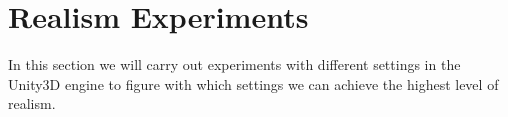 \section{Realism Experiments}

In this section we will carry out experiments with different settings in the Unity3D engine to figure with which settings we can achieve the highest level of realism.


